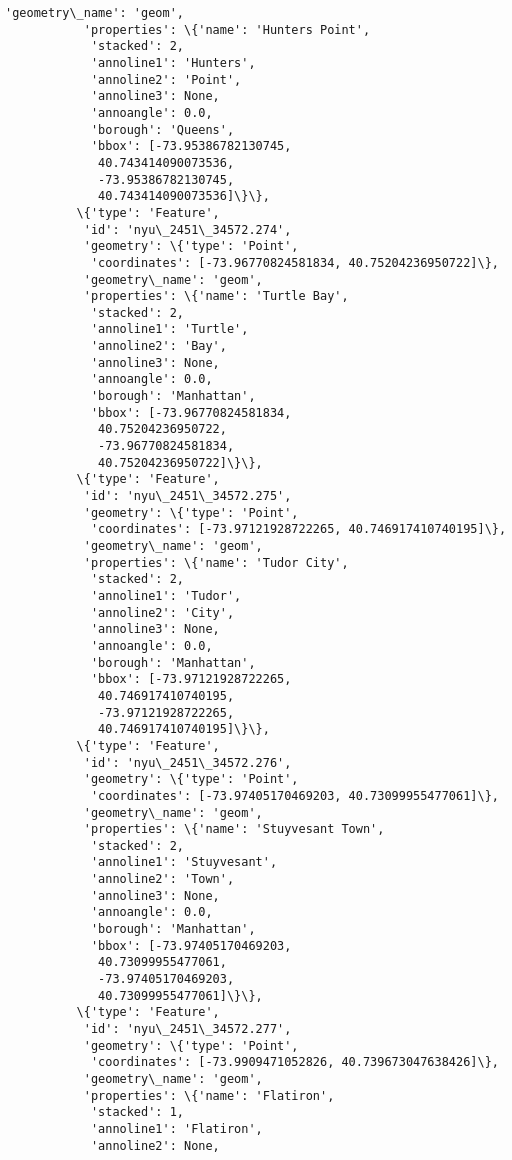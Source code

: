 \documentclass[11pt]{article}
\begin{document}
\begin{Verbatim}[commandchars=\\\{\}]
           'geometry\_name': 'geom',
           'properties': \{'name': 'Hunters Point',
            'stacked': 2,
            'annoline1': 'Hunters',
            'annoline2': 'Point',
            'annoline3': None,
            'annoangle': 0.0,
            'borough': 'Queens',
            'bbox': [-73.95386782130745,
             40.743414090073536,
             -73.95386782130745,
             40.743414090073536]\}\},
          \{'type': 'Feature',
           'id': 'nyu\_2451\_34572.274',
           'geometry': \{'type': 'Point',
            'coordinates': [-73.96770824581834, 40.75204236950722]\},
           'geometry\_name': 'geom',
           'properties': \{'name': 'Turtle Bay',
            'stacked': 2,
            'annoline1': 'Turtle',
            'annoline2': 'Bay',
            'annoline3': None,
            'annoangle': 0.0,
            'borough': 'Manhattan',
            'bbox': [-73.96770824581834,
             40.75204236950722,
             -73.96770824581834,
             40.75204236950722]\}\},
          \{'type': 'Feature',
           'id': 'nyu\_2451\_34572.275',
           'geometry': \{'type': 'Point',
            'coordinates': [-73.97121928722265, 40.746917410740195]\},
           'geometry\_name': 'geom',
           'properties': \{'name': 'Tudor City',
            'stacked': 2,
            'annoline1': 'Tudor',
            'annoline2': 'City',
            'annoline3': None,
            'annoangle': 0.0,
            'borough': 'Manhattan',
            'bbox': [-73.97121928722265,
             40.746917410740195,
             -73.97121928722265,
             40.746917410740195]\}\},
          \{'type': 'Feature',
           'id': 'nyu\_2451\_34572.276',
           'geometry': \{'type': 'Point',
            'coordinates': [-73.97405170469203, 40.73099955477061]\},
           'geometry\_name': 'geom',
           'properties': \{'name': 'Stuyvesant Town',
            'stacked': 2,
            'annoline1': 'Stuyvesant',
            'annoline2': 'Town',
            'annoline3': None,
            'annoangle': 0.0,
            'borough': 'Manhattan',
            'bbox': [-73.97405170469203,
             40.73099955477061,
             -73.97405170469203,
             40.73099955477061]\}\},
          \{'type': 'Feature',
           'id': 'nyu\_2451\_34572.277',
           'geometry': \{'type': 'Point',
            'coordinates': [-73.9909471052826, 40.739673047638426]\},
           'geometry\_name': 'geom',
           'properties': \{'name': 'Flatiron',
            'stacked': 1,
            'annoline1': 'Flatiron',
            'annoline2': None,

\end{Verbatim}
\end{document}
